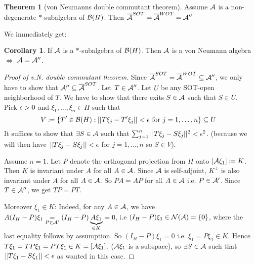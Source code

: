 \documentclass[10pt,english,a4paper]{article}
\theoremstyle{definition}
\newtheorem*{theorem}{Theorem}
\newtheorem*{corollary}{Corollary}
\begin{document}
\begin{theorem}[von Neumanns double commutant theorem]
    Assume $\mathcal{A}$ is a non-degenerate $*$-subalgebra of $\mathcal{B}(H)$. 
Then $\overline{\mathcal{A}}^{SOT} = \overline{\mathcal{A}}^{WOT} = \mathcal{A}''$ 
\end{theorem}
We immediately get:
\begin{corollary}
    If $\mathcal{A}$ is a $*$-subalgebra of $\mathcal{B}(H)$. Then $\mathcal{A}$ is a von
Neumann algebra $\iff$ $\mathcal{A} = \mathcal{A}''$.
\end{corollary}
\begin{proof}[Proof of v.N. double commutant theorem]
    Since $\overline{\mathcal{A}}^{SOT} = \overline{\mathcal{A}}^{WOT} \subseteq \mathcal{A}''$, we 
only have to show that $\mathcal{A}'' \subseteq \overline{\mathcal{A}}^{SOT}$.
Let $T \in \mathcal{A}''$. Let $U$ be any SOT-open neighborhood of $T$. We have 
to show that there exits $S \in \mathcal{A}$ such that $S \in U$. Pick 
$\epsilon > 0$ and $\xi_1,\ldots, \xi_n \in H$ such that 
\[ V\coloneqq \{ T' \in \mathcal{B}(H) : ||T\xi_j - T'\xi_j|| < \epsilon \text{ for }j
=1,\ldots,n \} \subseteq U\]
It suffices to show that $\exists S \in \mathcal{A}$ such that 
$\sum_{j=1}^{n} ||T\xi_j - S\xi_j||^2 < \epsilon^2$.
(because we will then have $||T\xi_j - S\xi_j || < \epsilon$ for $j=1,\ldots, n$
so $S \in V$).

Assume $n=1$. Let $P$ denote the orthogonal projection from $H$ onto
$[\mathcal{A}\xi_1] \coloneqq K$. Then $K$ is invariant under $A$ for all $A \in \mathcal{A}$.
Since $\mathcal{A}$ is self-adjoint, $K^{\perp}$ is also invariant under $A$ for all $A
\in \mathcal{A}$. So $PA = AP$ for all $A \in \mathcal{A}$ i.e. $P\in \mathcal{A}'$.
Since $T \in \mathcal{A}''$, we get $TP=PT$. 

Moreover $\xi_1 \in K$:
Indeed, for any $A \in \mathcal{A}$, we have $A(I_H - P)\xi_1 \underset{P\in \mathcal{A}'}{=}
(I_H-P)\underbrace{A\xi_1}_{\in
K} = 0$, i.e $(I_H -P)\xi_1 \in \mathcal{N}(\mathcal{A}) = \{0\}$, where the last equality
follows by assumption. So $(I_H - P)\xi_1 = 0$ i.e. $\xi_1 = P\xi_1 \in K$.
Hence $T\xi_1 = TP\xi_1 = PT\xi_1 \in K = [\mathcal{A}\xi_1]$.
($\mathcal{A}\xi_1$ is a subspace), 
so $\exists S \in \mathcal{A} $ such that $||T\xi_1 - S\xi_1|| < \epsilon$ as wanted in this case.


\end{proof}
\end{document}
